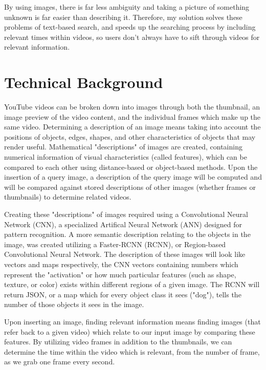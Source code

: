 \documentclass[10pt,twocolumn]{article}
\begin{document}
By using images, there is far less ambiguity and taking a picture of something unknown is far easier than describing it. Therefore, my solution solves these problems of text-based search, and speeds up the searching process by including relevant times within videos, so users don't always have to sift through videos for relevant information.

\section{Technical Background} 

YouTube videos can be broken down into images through both the thumbnail, an image preview of the video content, and the individual frames which make up the same video. Determining a description of an image means taking into account the positions of objects, edges, shapes, and other characteristics of objects that may render useful. Mathematical "descriptions" of images are created, containing numerical information of visual characteristics (called features), which can be compared to each other using distance-based or object-based methods. Upon the insertion of a query image, a description of the query image will be computed and will be compared against stored descriptions of other images (whether frames or thumbnails) to determine related videos.

Creating these "descriptions" of images required using a Convolutional Neural Network (CNN), a specialized Artifical Neural Network (ANN) designed for pattern recognition. A more semantic description relating to the objects in the image, was created utilizing a Faster-RCNN (RCNN), or Region-based Convolutional Neural Network. The description of these images will look like vectors and maps respectively, the CNN vectors containing numbers which represent the "activation" or how much particular features (such as shape, texture, or color) exists within different regions of a given image. The RCNN will return JSON, or a map which for every object class it sees ("dog"), tells the number of those objects it sees in the image.

Upon inserting an image, finding relevant information means finding images (that refer back to a given video) which relate to our input image by comparing these features. By utilizing video frames in addition to the thumbnails, we can determine the time within the video which is relevant, from the number of frame, as we grab one frame every second.
\end{document}
